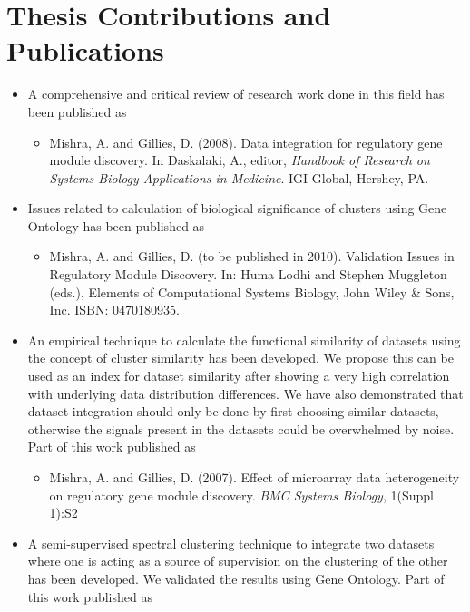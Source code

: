 \section{Thesis Contributions and Publications}
\begin{itemize}
    \item A comprehensive and critical review of research work done in this field has been published as
	\begin{itemize}
	\item Mishra, A. and Gillies, D. (2008). Data integration for regulatory gene module discovery. In Daskalaki, A., editor, \textit{Handbook of Research on Systems Biology Applications in Medicine}. IGI Global, Hershey, PA.
        \end{itemize}	
    \item Issues related to calculation of biological significance of clusters using Gene Ontology has been published as
       \begin{itemize} 
       \item Mishra, A. and Gillies, D. (to be published in 2010). Validation Issues in Regulatory Module Discovery. In: Huma Lodhi and Stephen Muggleton (eds.), Elements of Computational Systems Biology, John Wiley \& Sons, Inc. ISBN: 0470180935.
       \end{itemize}
    \item An empirical technique to calculate the functional similarity of datasets using the concept of cluster similarity has been developed. We propose this can be used as an index for dataset similarity after showing a very high correlation with underlying data distribution differences. We have also demonstrated that dataset integration should only be done by first choosing similar datasets, otherwise the signals present in the datasets could be overwhelmed by noise. Part of this work published as
	\begin{itemize}
	    \item Mishra, A. and Gillies, D. (2007). Effect of microarray data heterogeneity on regulatory gene module discovery. \textit{BMC Systems Biology}, 1(Suppl 1):S2
	\end{itemize}
    \item A semi-supervised spectral clustering technique to integrate two datasets where one is acting as a source of supervision on the clustering of the other has been developed. We validated the results using Gene Ontology.\nocite{mishra2007data,mishra2008Semisup,mishra2007elements} Part of this work published as
	\begin{itemize}

\end{itemize}
\end{itemize}
